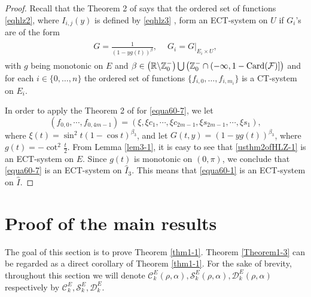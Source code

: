 \documentclass[11pt]{amsart}
\theoremstyle{remark}
\theoremstyle{definition}
\begin{document}
\begin{proof}
 Recall that the Theorem 2 of \cite{HLZ2023} says that     the ordered set of functions
 \eqref{eqhlz2},
where $I_{i,j}(y)$ is defined by
 \eqref{eqhlz3}
,   form an ECT-system on $U$ if
 $G_i$'s are of the form
  \begin{align*}\label{eq3}
\begin{split}
   G=\frac{1}{(1-yg(t))^{\beta}},\ \quad
  G_i=G|_{E_i\times U},
\end{split}
  \end{align*}
  with $g$ being monotonic on $E$ and $\beta\in\big(\mathbb R\backslash\mathbb Z^-_0\big)\bigcup\big(\mathbb Z^-_0\cap(-\infty,1-{\rm Card(\mathcal F)}]\big)$ and   for each $i\in\{0,\ldots,n\}$ the ordered set of functions $\{f_{i,0},\ldots,f_{i,m_i}\}$ is a CT-system on $E_i$.


  In order to apply  the Theorem 2 of \cite{HLZ2023} for  \eqref{equa60-7}, we let
  \begin{equation}\label{usthm2ofHLZ-1}
\left(f_{0,0},\cdots,f_{0,4m-1}\right)=\left(\xi, \xi c_1,  \cdots,   \xi c_{2m-1}, \xi s_{2m-1}, \cdots, \xi s_{1}\right),
\end{equation}
where $\xi(t)=\sin^2t (1-\cos t)^{\beta_3}$, and let $G(t,y)=\left(1-yg(t)\right)^{\beta_3}$, where
$g(t)=-\cot^2\frac{t}{2}$.
 From Lemma \ref{lem3-1}, it is easy to see that   \eqref{usthm2ofHLZ-1} is an  ECT-system on  $E$.
  Since  $g(t)$ is monotonic on $(0, \pi)$, we conclude that  \eqref{equa60-7} is  an ECT-system on   $\hat{I}_3$.  This means that
 \eqref{equa60-1} is  an ECT-system on   $\hat{I}$.






\end{proof}























\section{ Proof of the main results}

The goal of this section is to prove Theorem \ref{thm1-1}.  Theorem \ref{Theorem1-3} can be regarded as a direct corollary of Theorem \ref{thm1-1}.
 For the sake of brevity, throughout this section we will denote $\mathcal{C}_{k}^{E}(\rho,\alpha),
\mathcal{S}_{k}^{E}(\rho,\alpha), \mathcal{D}_{k}^{E}(\rho,\alpha)$ respectively by $\mathcal{C}_{k}^{E},
\mathcal{S}_{k}^{E}, \mathcal{D}_{k}^{E}$.
\end{document}

